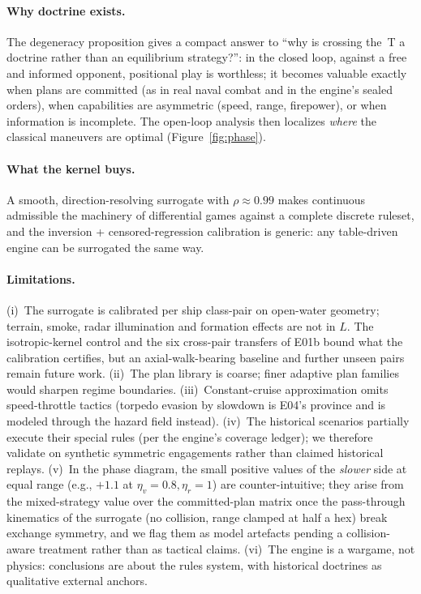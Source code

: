 \documentclass[12pt,a4paper]{article}
\newcommand{\etav}{\eta_v}
\newcommand{\etar}{\eta_r}
\begin{document}
\paragraph{Why doctrine exists.}  The degeneracy proposition gives a
compact answer to ``why is crossing the~T a doctrine rather than an
equilibrium strategy?'': in the closed loop, against a free and informed
opponent, positional play is worthless; it becomes valuable exactly when
plans are committed (as in real naval combat and in the engine's sealed
orders), when capabilities are asymmetric (speed, range, firepower), or
when information is incomplete.  The open-loop analysis then localizes
\emph{where} the classical maneuvers are optimal (Figure~\ref{fig:phase}).

\paragraph{What the kernel buys.}  A smooth, direction-resolving surrogate
with $\rho\approx0.99$ makes continuous admissible the machinery of
differential games against a complete discrete ruleset, and the inversion
+ censored-regression calibration is generic: any table-driven engine can
be surrogated the same way.

\paragraph{Limitations.}  (i)~The surrogate is calibrated per ship
class-pair on open-water geometry; terrain, smoke, radar illumination and
formation effects are not in $L$.  The isotropic-kernel control and the
six cross-pair transfers of E01b bound what the calibration certifies,
but an axial-walk-bearing baseline and further unseen pairs remain
future work.  (ii)~The plan library is coarse;
finer adaptive plan families would sharpen regime boundaries.
(iii)~Constant-cruise approximation omits speed-throttle tactics (torpedo
evasion by slowdown is E04's province and is modeled through the hazard
field instead).  (iv)~The historical scenarios partially execute their
special rules (per the engine's coverage ledger); we therefore validate on
synthetic symmetric engagements rather than claimed historical replays.
(v)~In the phase diagram, the small positive values of the \emph{slower}
side at equal range (e.g., $+1.1$ at $\etav=0.8, \etar=1$) are counter-intuitive; they arise from the mixed-strategy value over the committed-plan matrix once the pass-through kinematics of the surrogate (no
collision, range clamped at half a hex) break exchange symmetry, and we
flag them as model artefacts pending a collision-aware treatment rather
than as tactical claims.
(vi)~The engine is a wargame, not physics: conclusions are about the rules
system, with historical doctrines as qualitative external anchors.
\end{document}
